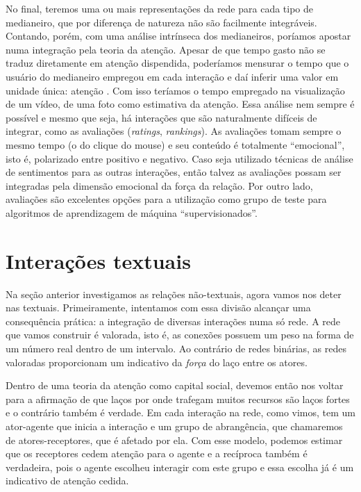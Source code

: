 \documentclass{article}
\begin{document}
No final, teremos uma ou mais representações da rede para cada tipo de
medianeiro, que por diferença de natureza não são facilmente integráveis.
Contando, porém, com uma análise intrínseca dos medianeiros, poríamos apostar
numa integração pela teoria da atenção. Apesar de que tempo gasto não se traduz
diretamente em atenção dispendida, poderíamos mensurar o tempo que o usuário do
medianeiro empregou em cada interação e daí inferir uma valor em unidade única:
atenção \cite{Davenport2001}. Com isso teríamos o tempo empregado na visualização
de um vídeo, de uma foto como estimativa da atenção. Essa análise nem sempre é
possível e mesmo que seja, há interações que são naturalmente difíceis de
integrar, como as avaliações (\textit{ratings}, \textit{rankings}). As avaliações
tomam sempre o mesmo tempo (o do clique do mouse) e seu conteúdo é totalmente
``emocional'', isto é, polarizado entre positivo e negativo. Caso seja utilizado
técnicas de análise de sentimentos para as outras interações, então talvez as
avaliações possam ser integradas pela dimensão emocional da força da relação.
Por outro lado, avaliações são excelentes opções para a utilização como grupo
de teste para algoritmos de aprendizagem de máquina ``supervisionados''.

\section{Interações textuais}

Na seção anterior investigamos as relações não-textuais, agora vamos nos deter
nas textuais. Primeiramente, intentamos com essa divisão alcançar uma
consequência prática: a integração de diversas interações numa só rede. A rede
que vamos construir é valorada, isto é, as conexões possuem um peso na forma de
um número real dentro de um intervalo. Ao contrário de redes binárias, as redes
valoradas proporcionam um indicativo da \textit{força} do laço entre os atores.

Dentro de uma teoria da atenção como capital social, devemos então nos voltar
para a afirmação de que laços por onde trafegam muitos recursos são laços fortes
e o contrário também é verdade. Em cada interação na rede, como vimos, tem um
ator-agente que inicia a interação e um grupo de abrangência, que chamaremos de
atores-receptores, que é afetado por ela. Com esse modelo, podemos estimar que
os receptores cedem atenção para o agente e a recíproca também é verdadeira,
pois o agente escolheu interagir com este grupo e essa escolha já é um
indicativo de atenção cedida.
\end{document}
